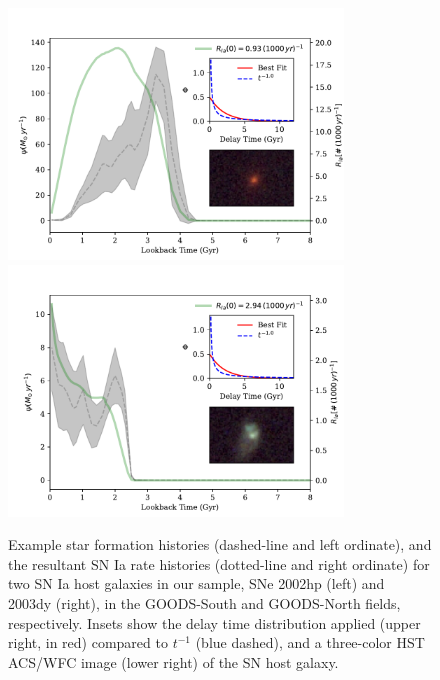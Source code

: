 \documentclass[apj, linenumbers]{aastex62}
\begin{document}
\begin{figure}[t] 
   \includegraphics[width=3.5in]{figure_sfh_demo_v1.pdf} 
   \includegraphics[width=3.5in]{figure_sfh_demo_v2.pdf} 
   \caption{\footnotesize Example star formation histories (dashed-line and left ordinate), and the resultant SN Ia rate histories (dotted-line and right ordinate) for two SN Ia host galaxies in our sample, SNe 2002hp (left) and 2003dy (right), in the GOODS-South and GOODS-North fields, respectively. Insets show the delay time distribution applied (upper right, in red) compared to $t^{-1}$ (blue dashed), and a three-color HST ACS/WFC image (lower right) of the SN host galaxy.}
   \label{fig:figure_sfh_fit_demo}
\end{figure}
\end{document}

